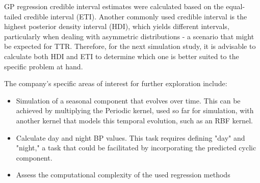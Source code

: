 GP regression credible interval estimates were calculated based on the equal-tailed
credible interval (ETI). Another commonly used credible interval is
the highest posterior density interval (HDI), which yields different intervals,
particularly when dealing with asymmetric distributions - a scenario that might be expected for TTR.
Therefore, for the next simulation study, it is advisable to calculate both HDI and ETI
to determine which one is better suited to the specific problem at hand.

The company's specific areas of interest for further exploration include:

\begin{itemize}
    \item Simulation of a seasonal component that evolves over time.
    This can be achieved by multiplying the Periodic kernel, used so far for simulation,
    with another kernel that models this temporal evolution, such as an RBF kernel.

    \item Calculate day and night BP values. This task requires defining "day" and "night," a task that could be
    facilitated by incorporating the predicted cyclic component.

    \item Assess the computational complexity of the used regression methods

\end{itemize}







